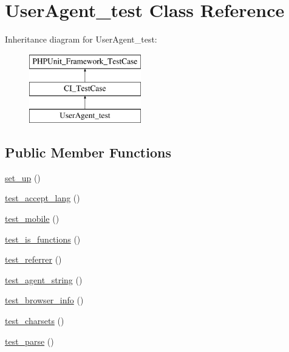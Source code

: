 \hypertarget{class_user_agent__test}{}\section{User\+Agent\+\_\+test Class Reference}
\label{class_user_agent__test}
Inheritance diagram for User\+Agent\+\_\+test\+:\begin{figure}[H]
\begin{center}
\leavevmode
\includegraphics[height=3.000000cm]{class_user_agent__test}
\end{center}
\end{figure}
\subsection*{Public Member Functions}
\begin{DoxyCompactItemize}
\item 
\hyperlink{class_user_agent__test_a69829875c8d4b6ce94908445c4155741}{set\+\_\+up} ()
\item 
\hyperlink{class_user_agent__test_a8ca153ad71e68291258f6689a8c357c8}{test\+\_\+accept\+\_\+lang} ()
\item 
\hyperlink{class_user_agent__test_af7326d808d44ab3e1004b913e457f3b6}{test\+\_\+mobile} ()
\item 
\hyperlink{class_user_agent__test_a9f315ea270281cb16772ef4099c7308e}{test\+\_\+is\+\_\+functions} ()
\item 
\hyperlink{class_user_agent__test_ac7426a66ba3a6408d2cd74d84ac79239}{test\+\_\+referrer} ()
\item 
\hyperlink{class_user_agent__test_a59543e9a671a1452caa58129933f7cb6}{test\+\_\+agent\+\_\+string} ()
\item 
\hyperlink{class_user_agent__test_af7f48b993d8e50f0ded2a5cc4fbc2551}{test\+\_\+browser\+\_\+info} ()
\item 
\hyperlink{class_user_agent__test_ad34e73f0d862320be51decdae6cab3fa}{test\+\_\+charsets} ()
\item 
\hyperlink{class_user_agent__test_a8caa4413116f05128e3509db6764226f}{test\+\_\+parse} ()
\end{DoxyCompactItemize}

